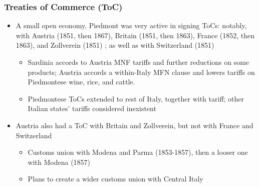 \documentclass[10pt]{beamer}
\begin{document}
\begin{frame}
    \frametitle{Treaties of Commerce (ToC)}

\begin{itemize}
    \item A small open economy, Piedmont was very active in signing ToCs: notably, with Austria (1851, then 1867), Britain (1851, then 1863), France (1852, then 1863), and Zollverein (1851) \citep{pahre2008}; as well as with Switzerland (1851)
    \begin{itemize}
        \item Sardinia accords to Austria MNF tariffs and further reductions on some products; Austria accords a within-Italy MFN clause and lowers tariffs on Piedmontese wine, rice, and cattle.  
        \item Piedmontese ToCs extended to rest of Italy, together with tariff; other Italian states' tariffs considered inexistent 
    \end{itemize}
    \bigskip
    \item Austria also had a ToC with Britain and Zollverein, but not with France and Switzerland \citep{pahre2008}
    \begin{itemize}
        \item Customs union with Modena and Parma (1853-1857), then a looser one with Modena (1857)  
        \item Plans to create a wider customs union with Central Italy 
    \end{itemize}
\end{itemize}

\end{frame}
\end{document}
